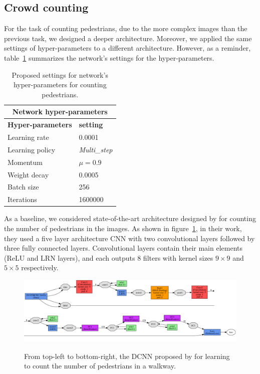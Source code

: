 \subsection{Crowd counting}
\label{subsec:ucsdarch}

For the task of counting pedestrians, due to the more complex images than the previous task, we designed a deeper architecture. Moreover, we applied the same settings of hyper-parameters to a different architecture. However, as a reminder, table~\ref{hypar2} summarizes the network's settings for the hyper-parameters.

\begin{table}[H]
	\centering
	\begin{tabular}{ |p{3.8cm}|p{1.7cm}| }
	\hline 
	\multicolumn{2}{|c|}{\textbf{Network hyper-parameters}} \\
	\hline
	\hline
	\textbf{Hyper-parameters} & \textbf{setting }\\
	\hline
	Learning rate & 0.0001\\
	\hline
	Learning policy    & \textit{Multi\_step} \\
	\hline
	Momentum & $\mu = 0.9$\\
	\hline
	Weight decay & 0.0005 \\
	\hline
	Batch size & 256 \\
	\hline
	Iterations & 1600000 \\
	\hline
	\end{tabular}
		\caption{Proposed settings for network's hyper-parameters for counting pedestrians.}
		\label{hypar2}
\end{table} 

As a baseline, we considered state-of-the-art architecture designed by \citealt*{segui2015learning} for counting the number of pedestrians in the images. As shown in figure~\ref{santiucsdnet}, in their work, they used a five layer architecture CNN with two convolutional layers followed by three fully connected layers. Convolutional layers contain their main elements (ReLU and LRN layers), and each outputs 8 filters with kernel sizes $9\times9$ and $5\times5$ respectively. 

\begin{figure}[H]
  \centering
   {\includegraphics[width=1.00\textwidth]{images/santiucsd}}
	\caption{From top-left to bottom-right, the DCNN proposed by \cite{segui2015learning} for learning to count the number of pedestrians in a walkway.}
	\label{santiucsdnet}
\end{figure}

